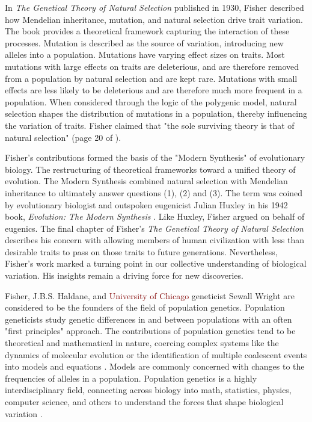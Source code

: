 In \textit{The Genetical Theory of Natural Selection} \cite{fisher_genetical_1930} published in 1930, Fisher described how Mendelian inheritance, mutation, and natural selection drive trait variation. The book provides a theoretical framework capturing the interaction of these processes. Mutation is described as the source of variation, introducing new alleles into a population. Mutations have varying effect sizes on traits. Most mutations with large effects on traits are deleterious, and are therefore removed from a population by natural selection and are kept rare. Mutations with small effects are less likely to be deleterious and are therefore much more frequent in a population. When considered through the logic of the polygenic model, natural selection shapes the distribution of mutations in a population, thereby influencing the variation of traits. Fisher claimed that "the sole surviving theory is that of natural selection" (page 20 of \cite{fisher_genetical_1930}). 

Fisher's contributions formed the basis of the "Modern Synthesis" of evolutionary biology. The restructuring of theoretical frameworks toward a unified theory of evolution. The Modern Synthesis combined natural selection with Mendelian inheritance to ultimately answer questions (1), (2) and (3). The term was coined by evolutionary biologist and outspoken eugenicist Julian Huxley in his 1942 book, \textit{Evolution: The Modern Synthesis} \cite{huxley_1942}. Like Huxley, Fisher argued on behalf of eugenics. The final chapter of Fisher's \textit{The Genetical Theory of Natural Selection} describes his concern with allowing members of human civilization with less than desirable traits to pass on those traits to future generations. Nevertheless, Fisher's work marked a turning point in our collective understanding of biological variation. His insights remain a driving force for new discoveries.

Fisher, J.B.S. Haldane, and \textcolor{maroon}{University of Chicago} geneticist Sewall Wright are considered to be the founders of the field of population genetics. Population geneticists study genetic differences in and between populations with an often "first principles" approach. The contributions of population genetics tend to be theoretical and mathematical in nature, coercing complex systems like the dynamics of molecular evolution or the identification of multiple coalescent events into models and equations \cite{mcdonald_sex_2016} \cite{rice_distinguishing_2018}. Models are commonly concerned with changes to the frequencies of alleles in a population. Population genetics is a highly interdisciplinary field, connecting across biology into math, statistics, physics, computer science, and others to understand the forces that shape biological variation \cite{gillespie_population_2004}. 

